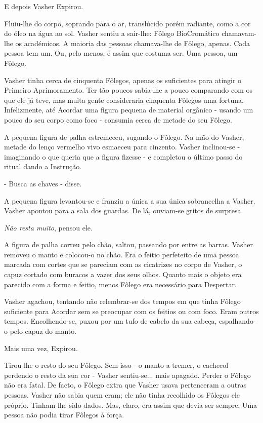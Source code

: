 \documentclass[11pt,a4paper]{book}
\begin{document}
 E depois Vasher Expirou.
 
 Fluiu-lhe do corpo, soprando para o ar, translúcido porém radiante, como a cor do óleo na água ao sol. Vasher sentiu a sair-lhe: Fôlego BioCromático chamavam-lhe os académicos. A maioria das pessoas chamava-lhe de Fôlego, apenas. Cada pessoa tem um. Ou, pelo menos, é assim que costuma ser. Uma pessoa, um Fôlego.
 
 Vasher tinha cerca de cinquenta Fôlegos, apenas os suficientes para atingir o Primeiro Aprimoramento. Ter tão poucos sabia-lhe a pouco comparando com os que ele já teve, mas muita gente consideraria cinquenta Fôlegos uma fortuna. Infelizmente, até Acordar uma figura pequena de material orgânico - usando um pouco do seu corpo como foco - consumia cerca de metade do seu Fôlego. 
 
 A pequena figura de palha estremeceu, sugando o Fôlego. Na mão do Vasher, metade do lenço vermelho vivo esmaeceu para cinzento. Vasher inclinou-se - imaginando o que queria que a figura fizesse - e completou o último passo do ritual dando a Instrução.
 
 - Busca as chaves - disse.
 
 A pequena figura levantou-se e franziu a única a sua única sobrancelha a Vasher. Vasher apontou para a sala dos guardas. De lá, ouviam-se gritos de surpresa.
 
 \textit{Não resta muito}, pensou ele.
 
 A figura de palha correu pelo chão, saltou, passando por entre as barras. Vasher removeu o manto e colocou-o no chão. Era o feitio perfeteito de uma pessoa marcada com cortes que se pareciam com as cicatrizes no corpo de Vasher, o capuz cortado com buracos a vazer dos seus olhos. Quanto mais o objeto era parecido com a forma e feitio, menos Fôlego era necessário para Despertar. 
 
 Vasher agachou, tentando não relembrar-se dos tempos em que tinha Fôlego suficiente para Acordar sem se preocupar com os feitios ou com foco. Eram outros tempos. Encolhendo-se, puxou por um tufo de cabelo da sua cabeça, espalhando-o pelo capuz do manto.
 
 Mais uma vez, Expirou.
 
 Tirou-lhe o resto do seu Fôlego. Sem isso - o manto a tremer, o cachecol perdendo o resto da sua cor -  Vasher sentiu-se... mais apagado. Perder o Fôlego não era fatal. De facto, o Fôlego extra que Vasher usava pertenceram a outras pessoas. Vasher não sabia quem eram; ele não tinha recolhido os Fôlegos ele próprio. Tinham lhe sido dados. Mas, claro, era assim que devia ser sempre. Uma pessoa não podia tirar Fôlegos à força. 
 
\end{document}

